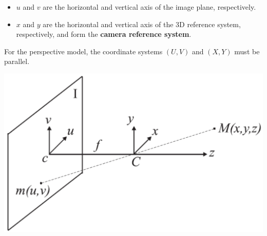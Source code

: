 \begin{minipage}{0.55\textwidth}
    \begin{itemize}[leftmargin=*]
        \item $u$ and $v$ are the horizontal and vertical axis of the image plane, respectively.
        \item $x$ and $y$ are the horizontal and vertical axis of the 3D reference system, respectively, 
            and form the \textbf{camera reference system}. 
    \end{itemize}

    \begin{remark}
        For the perspective model, the coordinate systems $(U, V)$ and $(X, Y)$ must be parallel.
    \end{remark}
\end{minipage}
\begin{minipage}{0.35\textwidth}
    \centering
    \includegraphics[width=\linewidth]{./img/perspective_projection2.png}
\end{minipage}

